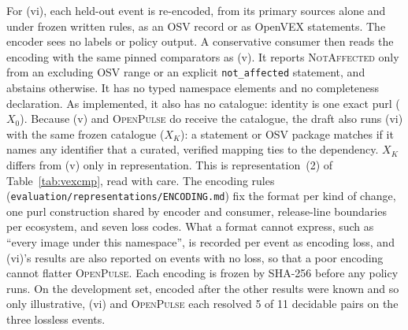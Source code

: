 \documentclass[11pt,a4paper]{article}
\newcommand{\op}{\textsc{OpenPulse}}
\newcommand{\code}[1]{\texttt{#1}}
\begin{document}
For (vi), each held-out event is re-encoded, from its primary sources
alone and under frozen written rules, as an OSV record or as OpenVEX
statements. The encoder sees no labels or policy output. A
conservative consumer then reads the encoding with the same pinned
comparators as (v). It reports \textsc{NotAffected} only from an
excluding OSV range or an explicit \code{not\_affected} statement, and
abstains otherwise. It has no typed namespace elements and no
completeness declaration. As implemented, it also has no catalogue:
identity is one exact purl ($X_0$). Because (v) and \op{} do receive
the catalogue, the draft also runs (vi) with the same frozen catalogue
($X_K$): a statement or OSV package matches if it names any identifier
that a curated, verified mapping ties to the dependency. $X_K$ differs
from (v) only in representation. This is representation~(2) of
Table~\ref{tab:vexcmp}, read with care. The encoding rules
(\code{evaluation/}\allowbreak\code{representations/}\allowbreak\code{ENCODING.md})
fix the format per kind of change, one purl construction shared by
encoder and consumer, release-line boundaries per ecosystem, and seven
loss codes. What a format cannot express, such as ``every image under
this namespace'', is recorded per event as encoding loss, and (vi)'s
results are also reported on events with no loss, so that a poor
encoding cannot flatter \op{}. Each encoding is frozen by SHA-256
before any policy runs. On the development set, encoded after the
other results were known and so only illustrative, (vi) and \op{} each
resolved 5 of 11 decidable pairs on the three lossless events.
\end{document}

